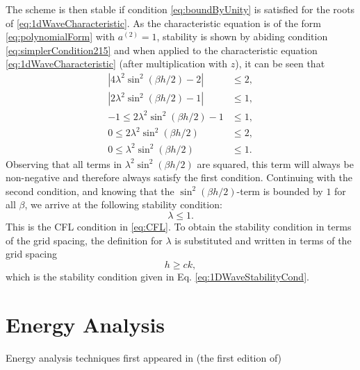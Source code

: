 {{%
The scheme is then stable if condition \eqref{eq:boundByUnity} is satisfied for the roots of \eqref{eq:1dWaveCharacteristic}. As the characteristic equation is of the form \eqref{eq:polynomialForm} with $a^{(2)} = 1$, stability is shown by abiding condition 
\eqref{eq:simplerCondition215} and when applied to the characteristic equation \eqref{eq:1dWaveCharacteristic} (after multiplication with $z$), it can be seen that
\begin{equation}\nonumber
    \begin{aligned}
        |4\lambda^2\sin^2(\beta h/2) - 2| &\leq 2,\\
        |2\lambda^2\sin^2(\beta h/2) - 1| &\leq 1,\\
        -1 \leq 2\lambda^2\sin^2(\beta h/2) - 1 &\leq 1,\\
        0 \leq 2\lambda^2\sin^2(\beta h/2)&\leq 2,\\
        0\leq \lambda^2\sin^2(\beta h/2) &\leq 1.
    \end{aligned}
\end{equation}
Observing that all terms in $\lambda^2\sin^2(\beta h/2)$ are squared, this term will always be non-negative and therefore always satisfy the first condition. Continuing with the second condition, and knowing that the $\sin^2(\beta h / 2)$-term is bounded by $1$ for all $\beta$, we arrive at the following stability condition:
\begin{equation*}
    \lambda \leq 1.
\end{equation*}
This is the CFL condition in \eqref{eq:CFL}. To obtain the stability condition in terms of the grid spacing, the definition for $\lambda$ is substituted and written in terms of the grid spacing
\begin{equation}
    h \geq ck,
\end{equation}
which is the stability condition given in Eq. \eqref{eq:1DWaveStabilityCond}.

\section{Energy Analysis}\label{sec:energyAnalysis}
Energy analysis techniques first appeared in (the first edition of) \cite{Gustafsson2013}

}}
